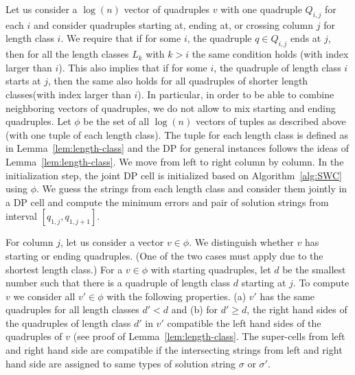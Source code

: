 Let us consider a $\log(n)$ vector of quadruples $v$ with one quadruple $Q_{i,j}$ for each $i$ and consider quadruples starting at, ending at, or crossing column $j$ for length class $i$.
We require that if for some $i$, the quadruple $q \in Q_{i,j}$ ends at $j$, then for all the length classes $L_k$ with $k>i$ the same condition holds (with index larger than $i$).
This also implies that if for some $i$, the quadruple of length class $i$ starts at $j$, then the same also holds for all quadruples of shorter length classes(with index larger than $i$).
In particular, in order to be able to combine neighboring vectors of quadruples, we do not allow to mix starting and ending quadruples.
Let $\phi$ be the set of all $\log(n)$ vectors of tuples as described above (with one tuple of each length class).
The tuple for each length class is defined as in Lemma~\ref{lem:length-class} and the DP for general instances follows the ideas of Lemma~\ref{lem:length-class}.
We move from left to right column by column. In the initialization step, the joint DP cell is initialized based on Algorithm~\ref{alg:SWC} using $\phi$.
We guess the strings from each length class and consider them jointly in a DP cell and compute the minimum errors and pair of solution strings from interval $[q_{1,j}, q_{1,j+1}]$.

For column $j$, let us consider a vector $v \in \phi$.
We distinguish whether $v$ has starting or ending quadruples. 
(One of the two cases must apply due to the shortest length class.)
For a $v \in \phi$ with starting quadruples,
let $d$ be the smallest number such that there is a quadruple of length class $d$ starting at $j$.
To compute $v$ we consider all $v' \in \phi$ with the following properties.
(a) $v'$ has the same quadruples for all length classes $d' < d$ and 
(b) for $d' \ge d$, the right hand sides of the quadruples of length class $d'$ in $v'$ compatible the left hand sides of the quadruples of $v$ (see proof of Lemma~\ref{lem:length-class}.
The super-cells from left and right hand side are compatible if the intersecting strings from left and right hand side are assigned to same types of solution string $\sigma$ or $\sigma'$.

